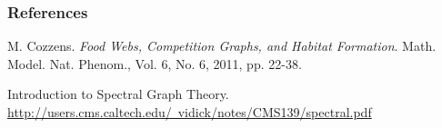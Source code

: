 \documentclass[aspectratio=43,leqno]{beamer}
\begin{document}
\begin{frame}
  \frametitle{References}

  \begin{thebibliography}{1}
  \bibitem[]{} M. Cozzens. \emph{Food Webs, Competition Graphs, and Habitat Formation}. Math. Model. Nat. Phenom., Vol. 6, No. 6, 2011, pp. 22-38.
  \end{thebibliography}

  \begin{thebibliography}{1}
  \bibitem[]{} Introduction to Spectral Graph Theory. \hyperref{http://users.cms.caltech.edu/~vidick/notes/CMS139/spectral.pdf}{}{}{http://users.cms.caltech.edu/~vidick/notes/CMS139/spectral.pdf}
  \end{thebibliography}

\end{frame}
\end{document}
